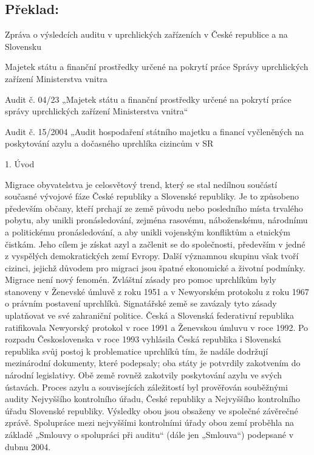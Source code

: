 \documentclass[10pt]{article}
\begin{document}
\pagebreak

\subsection*{Překlad:}



Zpráva o výsledcích auditu v uprchlických zařízeních v České republice a na Slovensku



Majetek státu a finanční prostředky určené na pokrytí práce Správy uprchlických zařízení Ministerstva vnitra



Audit č. 04/23 „Majetek státu a finanční prostředky určené na pokrytí práce správy uprchlických zařízení Ministerstva vnitra“



Audit č. 15/2004 „Audit hospodaření státního majetku a financí vyčleněných na poskytování azylu a dočasného uprchlíka cizincům v SR



1. Úvod

Migrace obyvatelstva je celosvětový trend, který se stal nedílnou součástí současné vývojové fáze České republiky a Slovenské republiky.
Je to způsobeno především občany, kteří prchají ze země původu nebo posledního místa trvalého pobytu, aby unikli pronásledování, zejména rasovému, náboženskému, národnímu a politickému pronásledování, a aby unikli vojenským konfliktům a etnickým čistkám.
Jeho cílem je získat azyl a začlenit se do společnosti, především v jedné z vyspělých demokratických zemí Evropy.
Další významnou skupinu však tvoří cizinci, jejichž důvodem pro migraci jsou špatné ekonomické a životní podmínky.
Migrace není nový fenomén.
Zvláštní zásady pro pomoc uprchlíkům byly stanoveny v Ženevské úmluvě z roku 1951 a v Newyorském protokolu z roku 1967 o právním postavení uprchlíků. Signatářské země se zavázaly tyto zásady uplatňovat ve své zahraniční politice.
Česká a Slovenská federativní republika ratifikovala Newyorský protokol v roce 1991 a Ženevskou úmluvu v roce 1992.
Po rozpadu Československa v roce 1993 vyhlásila Česká republika i Slovenská republika svůj postoj k problematice uprchlíků tím, že nadále dodržují mezinárodní dokumenty, které podepsaly; oba státy je potvrdily zakotvením do národní legislativy.
Obě země rovněž zakotvily poskytování azylu ve svých ústavách.
Proces azylu a souvisejících záležitostí byl prověřován souběžnými audity Nejvyššího kontrolního úřadu, České republiky a Nejvyššího kontrolního úřadu Slovenské republiky. Výsledky obou jsou obsaženy ve společné závěrečné zprávě.
Spolupráce mezi nejvyššími kontrolními úřady obou zemí proběhla na základě „Smlouvy o spolupráci při auditu“ (dále jen „Smlouva“) podepsané v dubnu 2004.
\end{document}

